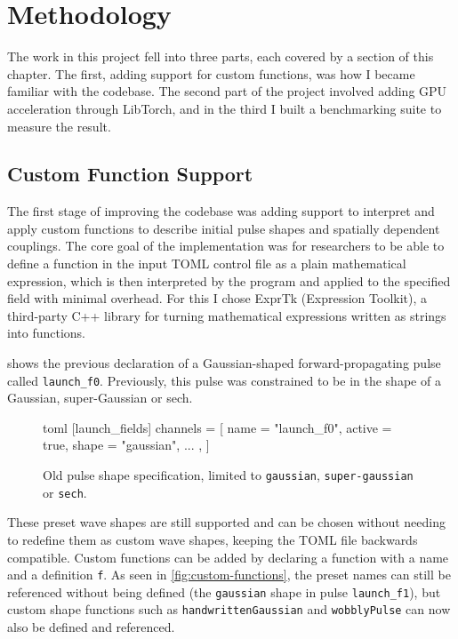 \chapter{Methodology}

The work in this project fell into three parts, each covered by a section of this chapter. 
The first, adding support for custom functions, was how I became familiar with the codebase. 
The second part of the project involved adding GPU acceleration through LibTorch, 
and in the third I built a benchmarking suite to measure the result.

\section{Custom Function Support}

The first stage of improving the codebase was adding support to interpret and apply custom functions to describe 
initial pulse shapes and spatially dependent couplings. The core goal of the implementation was for researchers to be 
able to define a function in the input TOML control file as a plain mathematical expression, which is then interpreted 
by the program and applied to the specified field with minimal overhead. For this I chose ExprTk 
(Expression Toolkit), a third-party C++ library for turning mathematical expressions written as strings into functions.

 shows the previous declaration of a Gaussian-shaped forward-propagating pulse called \texttt{launch\_f0}. Previously, this pulse was constrained to be in the shape of a Gaussian, super-Gaussian or sech.

\begin{figure}
\begin{code}{toml}
[launch_fields]
channels = [
  { name = "launch_f0", active = true, shape = "gaussian", ... },
]
\end{code}
  \caption{Old pulse shape specification, limited to \texttt{gaussian}, \texttt{super-gaussian} or \texttt{sech}.}
  \label{fig:old-pulse-shape}
\end{figure}

These preset wave shapes are still supported and can be chosen without needing to redefine them as custom wave shapes, 
keeping the TOML file backwards compatible. Custom functions can be added by declaring a function with a name and a 
definition \texttt{f}. As seen in \cref{fig:custom-functions}, the preset names can still be referenced without being 
defined (the \texttt{gaussian} shape in pulse \texttt{launch\_f1}), but custom shape functions such as 
\texttt{handwrittenGaussian} and \texttt{wobblyPulse} can now also be defined and referenced.


